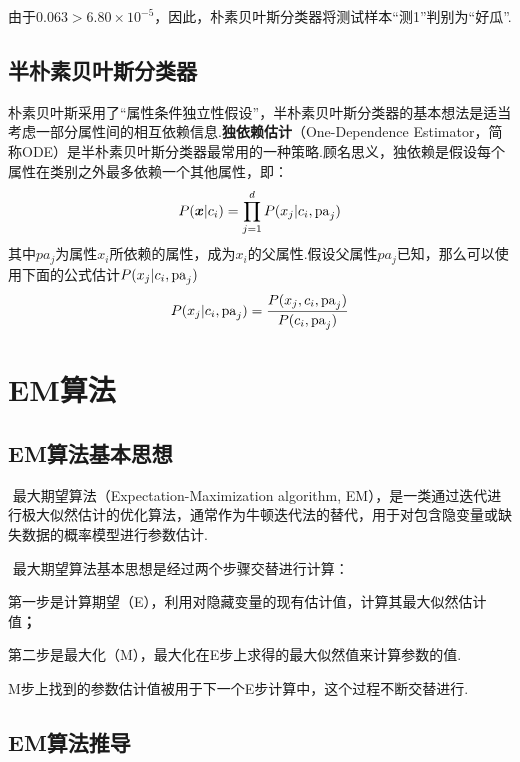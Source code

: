 由于$0.063>6.80\times 10^{-5}$，因此，朴素贝叶斯分类器将测试样本``测1''判别为``好瓜''.

\subsection{半朴素贝叶斯分类器}\label{ux534aux6734ux7d20ux8d1dux53f6ux65afux5206ux7c7bux5668}

​
朴素贝叶斯采用了``属性条件独立性假设''，半朴素贝叶斯分类器的基本想法是适当考虑一部分属性间的相互依赖信息.\textbf{独依赖估计}（One-Dependence
Estimator，简称ODE）是半朴素贝叶斯分类器最常用的一种策略.顾名思义，独依赖是假设每个属性在类别之外最多依赖一个其他属性，即：
\[
P(\boldsymbol{x}|c_i)=\prod_{j=1}^d P(x_j|c_i,{\rm pa}_j)
\]
其中$pa_j$为属性$x_i$所依赖的属性，成为$x_i$的父属性.假设父属性$pa_j$已知，那么可以使用下面的公式估计$P(x_j|c_i,{\rm pa}_j)$
\[
P(x_j|c_i,{\rm pa}_j)=\frac{P(x_j,c_i,{\rm pa}_j)}{P(c_i,{\rm pa}_j)}
\]

\section{ EM算法}\label{emux7b97ux6cd5}

\subsection{EM算法基本思想}\label{emux7b97ux6cd5ux57faux672cux601dux60f3}

​ 最大期望算法（Expectation-Maximization algorithm,
EM），是一类通过迭代进行极大似然估计的优化算法，通常作为牛顿迭代法的替代，用于对包含隐变量或缺失数据的概率模型进行参数估计.

​ 最大期望算法基本思想是经过两个步骤交替进行计算：

​
第一步是计算期望（E），利用对隐藏变量的现有估计值，计算其最大似然估计值\textbf{；}

​ 第二步是最大化（M），最大化在E步上求得的最大似然值来计算参数的值.

​ M步上找到的参数估计值被用于下一个E步计算中，这个过程不断交替进行.

\subsection{EM算法推导}\label{emux7b97ux6cd5ux63a8ux5bfc}

